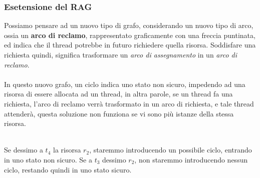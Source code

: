 \documentclass[12pt, letterpaper]{article}
\newcommand{\acc}{\\\hphantom{}\\}
\begin{document}
\subsubsection{Esetensione del RAG}
Possiamo pensare ad un nuovo tipo di grafo, considerando un nuovo tipo di arco, ossia un \textbf{arco di reclamo}, rappresentato graficamente con una freccia puntinata, ed indica che il 
thread potrebbe in futuro richiedere quella risorsa. Soddisfare una richiesta quindi, significa 
trasformare un \textit{arco di assegnamento} in un \textit{arco di reclamo}. \acc In questo nuovo 
grafo, un ciclo indica uno stato non sicuro, impedendo ad una risorsa di essere allocata ad un thread, in altra parole, 
se un thread fa una richiesta, l'arco di reclamo verrà trasformato in un arco di richiesta, e tale thread 
attenderà, questa soluzione non funziona se vi sono più istanze della stessa risorsa.\begin{figure}[h]
\end{figure}
\\ Se dessimo a \(t_4\) la risorsa \(r_2\), staremmo introducendo un possibile ciclo, entrando in uno 
stato non sicuro. Se a \(t_3\) dessimo \(r_2\), non staremmo introducendo nessun ciclo, restando quindi 
in uno stato sicuro.
\end{document}
